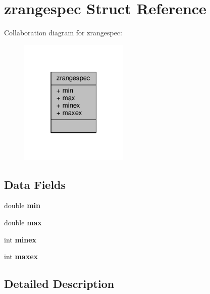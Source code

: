 \hypertarget{structzrangespec}{}\section{zrangespec Struct Reference}
\label{structzrangespec}


Collaboration diagram for zrangespec\+:\nopagebreak
\begin{figure}[H]
\begin{center}
\leavevmode
\includegraphics[width=147pt]{structzrangespec__coll__graph}
\end{center}
\end{figure}
\subsection*{Data Fields}
\begin{DoxyCompactItemize}
\item 
\mbox{\label{structzrangespec_acd10595ad54934dbe57573a2818095cc}} 
double {\bfseries min}
\item 
\mbox{\label{structzrangespec_a66215d3127231dc4c25564c6edc4e8c6}} 
double {\bfseries max}
\item 
\mbox{\label{structzrangespec_afa6be3c7c99e2487e04dbea9ca2e6839}} 
int {\bfseries minex}
\item 
\mbox{\label{structzrangespec_afac44097ac0846db7dd1609fa8365bb2}} 
int {\bfseries maxex}
\end{DoxyCompactItemize}


\subsection{Detailed Description}



